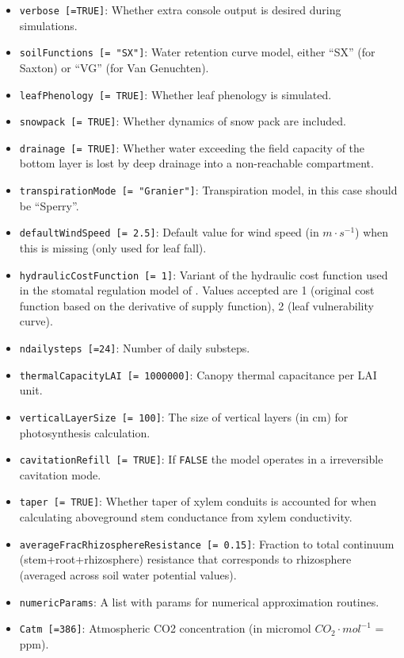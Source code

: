 \documentclass[]{book}
\providecommand{\tightlist}{%
  \setlength{\itemsep}{0pt}\setlength{\parskip}{0pt}}
\begin{document}
\begin{itemize}
\tightlist
\item
  \texttt{verbose\ {[}=TRUE{]}}: Whether extra console output is desired during simulations.
\item
  \texttt{soilFunctions\ {[}=\ "SX"{]}}: Water retention curve model, either ``SX'' (for Saxton) or ``VG'' (for Van Genuchten).
\item
  \texttt{leafPhenology\ {[}=\ TRUE{]}}: Whether leaf phenology is simulated.
\item
  \texttt{snowpack\ {[}=\ TRUE{]}}: Whether dynamics of snow pack are included.
\item
  \texttt{drainage\ {[}=\ TRUE{]}}: Whether water exceeding the field capacity of the bottom layer is lost by deep drainage into a non-reachable compartment.
\item
  \texttt{transpirationMode\ {[}=\ "Granier"{]}}: Transpiration model, in this case should be ``Sperry''.
\item
  \texttt{defaultWindSpeed\ {[}=\ 2.5{]}}: Default value for wind speed (in \(m \cdot s^{-1}\)) when this is missing (only used for leaf fall).
\item
  \texttt{hydraulicCostFunction\ {[}=\ 1{]}}: Variant of the hydraulic cost function used in the stomatal regulation model of \citet{Sperry2016}. Values accepted are 1 (original cost function based on the derivative of supply function), 2 (leaf vulnerability curve).
\item
  \texttt{ndailysteps\ {[}=24{]}}: Number of daily substeps.
\item
  \texttt{thermalCapacityLAI\ {[}=\ 1000000{]}}: Canopy thermal capacitance per LAI unit.
\item
  \texttt{verticalLayerSize\ {[}=\ 100{]}}: The size of vertical layers (in cm) for photosynthesis calculation.
\item
  \texttt{cavitationRefill\ {[}=\ TRUE{]}}: If \texttt{FALSE} the model operates in a irreversible cavitation mode.
\item
  \texttt{taper\ {[}=\ TRUE{]}}: Whether taper of xylem conduits is accounted for when calculating aboveground stem conductance from xylem conductivity.
\item
  \texttt{averageFracRhizosphereResistance\ {[}=\ 0.15{]}}: Fraction to total continuum (stem+root+rhizosphere) resistance that corresponds to rhizosphere (averaged across soil water potential values).
\item
  \texttt{numericParams}: A list with params for numerical approximation routines.
\item
  \texttt{Catm\ {[}=386{]}}: Atmospheric CO2 concentration (in micromol \(CO_2 \cdot mol^{-1}\) = ppm).
\end{itemize}
\end{document}
